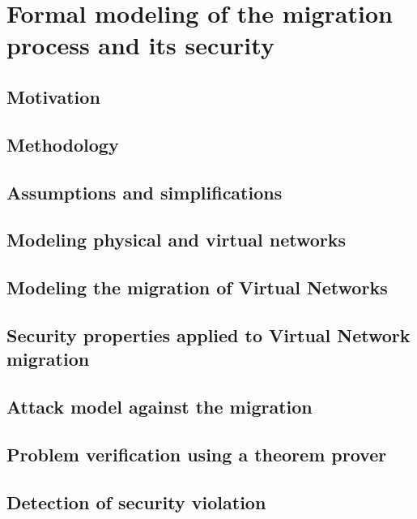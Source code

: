 \documentclass[a4paper, 11pt]{article}
\begin{document}
\newpage
\section{Formal modeling of the migration process and its security}
\subsection{Motivation}


\subsection{Methodology}


\subsection{Assumptions and simplifications}


\subsection{Modeling physical and virtual networks}


\subsection{Modeling the migration of Virtual Networks}


\subsection{Security properties applied to Virtual Network migration}


\subsection{Attack model against the migration}


\subsection{Problem verification using a theorem prover}


\subsection{Detection of security violation}

\end{document}
